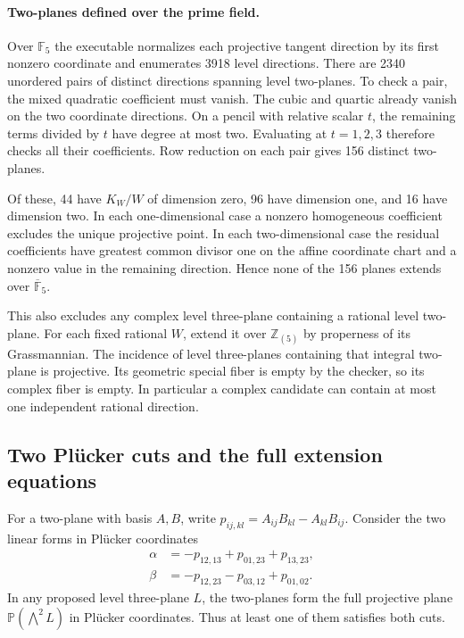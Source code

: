 \paragraph{Two-planes defined over the prime field.}
Over \(\mathbb F_5\) the executable normalizes each projective tangent
direction by its first nonzero coordinate and enumerates 3918 level
directions. There are 2340 unordered pairs of distinct directions
spanning level two-planes. To check a pair, the mixed quadratic
coefficient must vanish. The cubic and quartic already vanish on
the two coordinate directions. On a pencil with relative scalar
\(t\), the remaining terms divided by \(t\) have degree at most two.
Evaluating at \(t=1,2,3\) therefore checks all their coefficients.
Row reduction on each pair gives 156 distinct two-planes.

Of these, 44 have \(K_W/W\) of dimension zero, 96 have dimension
one, and 16 have dimension two. In each one-dimensional case a
nonzero homogeneous coefficient excludes the unique projective
point. In each two-dimensional case the residual coefficients
have greatest common divisor one on the affine coordinate chart
and a nonzero value in the remaining direction. Hence none of the
156 planes extends over \(\overline{\mathbb F}_5\).

This also excludes any complex level three-plane containing a
rational level two-plane. For each fixed rational \(W\), extend it
over \(\mathbb Z_{(5)}\) by properness of its Grassmannian.
The incidence of level three-planes containing that integral
two-plane is projective. Its geometric special fiber is empty by
the checker, so its complex fiber is empty. In particular a complex
candidate can contain at most one independent rational direction.

\subsection{Two Pl\"ucker cuts and the full extension equations}
\label{sec:gct-plucker}

For a two-plane with basis \(A,B\), write
\(p_{ij,kl}=A_{ij}B_{kl}-A_{kl}B_{ij}\). Consider the two linear
forms in Pl\"ucker coordinates
\begin{align*}
 \alpha&=-p_{12,13}+p_{01,23}+p_{13,23},\\
 \beta&=-p_{12,23}-p_{03,12}+p_{01,02}.
\end{align*}
In any proposed level three-plane \(L\), the two-planes form the full
projective plane \(\mathbb P(\bigwedge^2L)\) in Pl\"ucker coordinates.
Thus at least one of them satisfies both cuts.

